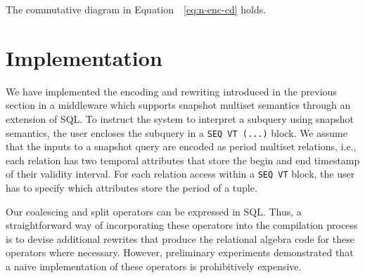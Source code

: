 \begin{theo}\label{theo:reduction-is-correct}
The commutative diagram in Equation~~\eqref{eq:n-enc-cd} holds.
\end{theo}

\section{Implementation}
\label{sec:implementation}

We have implemented the encoding and rewriting introduced in the
previous section in a middleware which supports snapshot multiset
semantics through an extension of SQL. To instruct the system to
interpret a subquery using snapshot semantics, the user encloses the
subquery in a \texttt{SEQ VT (...)} block. We assume that the inputs
to a snapshot query are encoded as period multiset relations, i.e.,
each relation has two temporal attributes that store the begin and end
timestamp of their validity interval. For each relation access within
a \texttt{SEQ VT} block, the user has to specify which attributes
store the period of a tuple. 



Our coalescing and split operators can be expressed in SQL. Thus, a
straightforward way of incorporating these operators into the
compilation process is to devise additional rewrites that produce the
relational algebra code for these operators where necessary. However,
preliminary experiments demonstrated that a naive implementation of
these operators is prohibitively expensive. 

